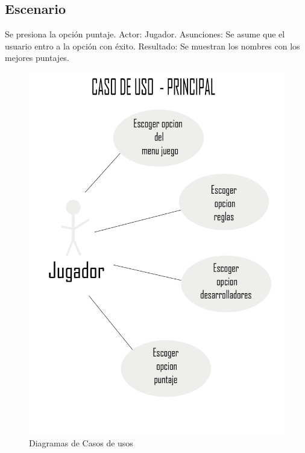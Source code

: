 \subsection{Escenario}
Se presiona la opción puntaje.\newline \newline
Actor: Jugador.\newline
Asunciones: Se asume que el usuario entro a la opción con éxito.\newline
Resultado: Se muestran los nombres con los mejores puntajes.\newline
\begin{figure}[htbp]
\begin{center}
\includegraphics[width=.60\textwidth]{./imagenes/DCU.jpg}
\caption{Diagramas de Casos de usos}
\end{center}
\end{figure}
